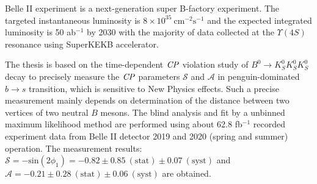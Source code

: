 % 
% 
%
Belle II experiment is a next-generation super B-factory experiment. The targeted instantaneous luminosity is 
$8 \times 10^{35}~ \text{cm}^{-2}\text{s}^{-1}$ and the expected integrated luminosity is 50 ab$^{-1}$ by 2030 with the majority of data collected at the $\Upsilon(4S)$ resonance using SuperKEKB accelerator.

The thesis is based on the time-dependent $\it{CP}$ violation study of $B^0 \to K_S^0 K_S^0 K_S^0$ decay to precisely measure the $\it{CP}$ parameters $\mathcal{S}$ and $\mathcal{A}$ in penguin-dominated $b \to s$ transition, which is sensitive to New Physics effects. Such a precise measurement mainly depends on determination of the distance between two vertices of two neutral $B$ mesons. The blind analysis and fit by a unbinned maximum likelihood method are performed using about 62.8 fb$^{-1}$ recorded experiment data from Belle II detector 2019 and 2020 (spring and summer) operation. The measurement results: $\mathcal{S}= - \text{sin}(2\phi_1) = -0.82 \pm 0.85 \: (\text{stat}) \pm 0.07 \: (\text{syst})$ and $\mathcal{A}= -0.21 \pm 0.28 \: (\text{stat}) \pm 0.06 \: (\text{syst})$ are obtained.




 

